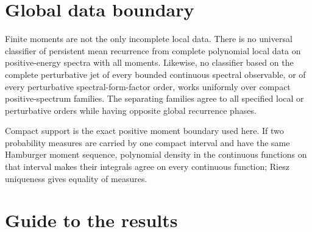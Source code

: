\section{Global data boundary}

Finite moments are not the only incomplete local data.  There is no
universal classifier of persistent mean recurrence from complete polynomial
local data on positive-energy spectra with all moments.  Likewise, no
classifier based on the complete perturbative jet of every bounded continuous
spectral observable, or of every perturbative spectral-form-factor order,
works uniformly over compact positive-spectrum families.  The separating
families agree to all specified local or perturbative orders while having
opposite global recurrence phases.

Compact support is the exact positive moment boundary used here.  If two
probability measures are carried by one compact interval and have the same
Hamburger moment sequence, polynomial density in the continuous functions on
that interval makes their integrals agree on every continuous function;
Riesz uniqueness gives equality of measures.

\section{Guide to the results}

